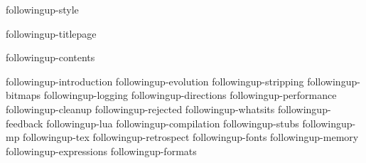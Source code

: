 
\environment followingup-style

\dontcomplain

\startdocument

    \component followingup-titlepage

    \startfrontmatter
        \component followingup-contents
    \stopfrontmatter

    \startbodymatter
        \component followingup-introduction
        \component followingup-evolution
        \component followingup-stripping
        \component followingup-bitmaps
        \component followingup-logging
        \component followingup-directions
        \component followingup-performance
        \component followingup-cleanup
        \component followingup-rejected
        \component followingup-whatsits
        \component followingup-feedback
        \component followingup-lua
        \component followingup-compilation
        \component followingup-stubs
        \component followingup-mp
        \component followingup-tex
        \component followingup-retrospect
        \component followingup-fonts
        \component followingup-memory
        \component followingup-expressions
        \component followingup-formats
    \stopbodymatter

\stopdocument

